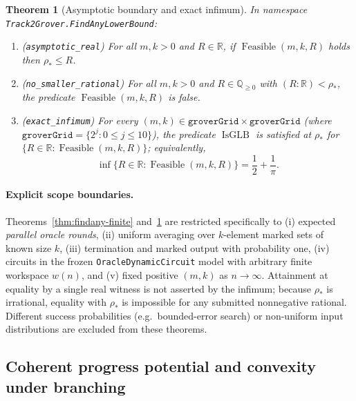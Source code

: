 \documentclass[11pt,a4paper]{article}
\newtheorem{theorem}{Theorem}[section]
\theoremstyle{definition}
\theoremstyle{remark}
\begin{document}
\begin{theorem}[Asymptotic boundary and exact infimum]
\label{thm:findany-asymp}
In namespace \texttt{Track2Grover.\allowbreak FindAny\allowbreak LowerBound}:
\begin{enumerate}
\item \textup{(\texttt{asymptotic\_real})} For all \(m,k > 0\) and \(R \in \mathbb{R}\), if \(\operatorname{Feasible}(m,k,R)\) holds then \(\rho_* \le R\).
\item \textup{(\texttt{no\_\allowbreak smaller\_\allowbreak rational})} For all \(m,k > 0\) and \(R \in \mathbb{Q}_{\ge 0}\) with \((R : \mathbb{R}) < \rho_*\), the predicate \(\operatorname{Feasible}(m,k,R)\) is false.
\item \textup{(\texttt{exact\_infimum})} For every \((m,k) \in \texttt{groverGrid} \times \texttt{groverGrid}\) (where \(\texttt{groverGrid} = \{2^j : 0 \le j \le 10\}\)), the predicate \(\operatorname{IsGLB}\) is satisfied at \(\rho_*\) for \(\{R \in \mathbb{R} : \operatorname{Feasible}(m,k,R)\}\); equivalently,
\[
  \inf\{R \in \mathbb{R} : \operatorname{Feasible}(m,k,R)\} = \frac{1}{2} + \frac{1}{\pi}.
\]
\end{enumerate}
\end{theorem}

\paragraph{Explicit scope boundaries.}
Theorems~\ref{thm:findany-finite} and~\ref{thm:findany-asymp} are restricted specifically to (i) expected \emph{parallel oracle rounds}, (ii) uniform averaging over \(k\)-element marked sets of known size \(k\), (iii) termination and marked output with probability one, (iv) circuits in the frozen \texttt{OracleDynamic\allowbreak Circuit} model with arbitrary finite workspace \(w(n)\), and (v) fixed positive \((m,k)\) as \(n \to \infty\). Attainment at equality by a single real witness is not asserted by the infimum; because \(\rho_*\) is irrational, equality with \(\rho_*\) is impossible for any submitted nonnegative rational. Different success probabilities (e.g.\ bounded-error search) or non-uniform input distributions are excluded from these theorems.

\subsection{Coherent progress potential and convexity under branching}
\label{sec:findany-potential}
\end{document}
